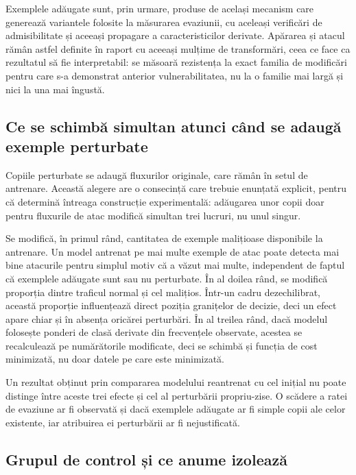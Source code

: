 Exemplele adăugate sunt, prin urmare, produse de același mecanism care generează variantele folosite la măsurarea evaziunii, cu aceleași verificări de admisibilitate și aceeași propagare a caracteristicilor derivate. Apărarea și atacul rămân astfel definite în raport cu aceeași mulțime de transformări, ceea ce face ca rezultatul să fie interpretabil: se măsoară rezistența la exact familia de modificări pentru care s-a demonstrat anterior vulnerabilitatea, nu la o familie mai largă și nici la una mai îngustă.

\subsection{Ce se schimbă simultan atunci când se adaugă exemple perturbate}\label{subsec:confuzii}

Copiile perturbate se adaugă fluxurilor originale, care rămân în setul de antrenare. Această alegere are o consecință care trebuie enunțată explicit, pentru că determină întreaga construcție experimentală: adăugarea unor copii doar pentru fluxurile de atac modifică simultan trei lucruri, nu unul singur.

Se modifică, în primul rând, cantitatea de exemple malițioase disponibile la antrenare. Un model antrenat pe mai multe exemple de atac poate detecta mai bine atacurile pentru simplul motiv că a văzut mai multe, independent de faptul că exemplele adăugate sunt sau nu perturbate. În al doilea rând, se modifică proporția dintre traficul normal și cel malițios. Într-un cadru dezechilibrat, această proporție influențează direct poziția granițelor de decizie, deci un efect apare chiar și în absența oricărei perturbări. În al treilea rând, dacă modelul folosește ponderi de clasă derivate din frecvențele observate, acestea se recalculează pe numărătorile modificate, deci se schimbă și funcția de cost minimizată, nu doar datele pe care este minimizată.

Un rezultat obținut prin compararea modelului reantrenat cu cel inițial nu poate distinge între aceste trei efecte și cel al perturbării propriu-zise. O scădere a ratei de evaziune ar fi observată și dacă exemplele adăugate ar fi simple copii ale celor existente, iar atribuirea ei perturbării ar fi nejustificată.

\subsection{Grupul de control și ce anume izolează}\label{subsec:control}

